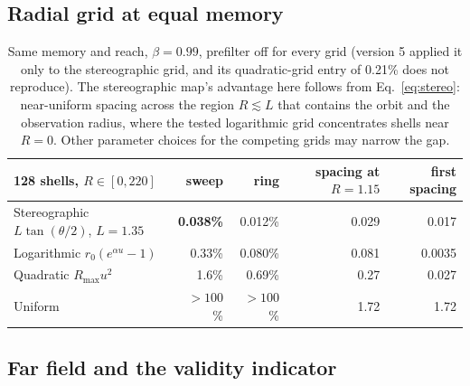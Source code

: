 \documentclass[11pt, a4paper]{article}
\begin{document}
\subsection{Radial grid at equal memory}
\begin{table}[htbp]
\centering
\begin{tabular}{@{}lrrrr@{}}
\toprule
128 shells, $R \in [0, 220]$ & sweep & ring & spacing at $R = 1.15$ & first spacing \\
\midrule
Stereographic $L\tan(\theta/2)$, $L = 1.35$ & \textbf{0.038\%} & 0.012\% & 0.029 & 0.017 \\
Logarithmic $r_0(e^{\alpha u} - 1)$         & 0.33\%  & 0.080\% & 0.081 & 0.0035 \\
Quadratic $R_{\max} u^2$                    & 1.6\%   & 0.69\%  & 0.27  & 0.027 \\
Uniform                                     & $>100$\% & $>100$\% & 1.72 & 1.72 \\
\bottomrule
\end{tabular}
\caption{Same memory and reach, $\beta = 0.99$, prefilter off for every grid (version 5 applied it only to the stereographic grid, and its quadratic-grid entry of 0.21\% does not reproduce). The stereographic map's advantage here follows from Eq.~\eqref{eq:stereo}: near-uniform spacing across the region $R \lesssim L$ that contains the orbit and the observation radius, where the tested logarithmic grid concentrates shells near $R = 0$. Other parameter choices for the competing grids may narrow the gap.}
\label{tab:grids}
\end{table}

\subsection{Far field and the validity indicator}\label{sec:far}
\begin{table}[htbp]
\centering
{}
\caption{Circular orbit, $\beta = 0.9$: relative $L_2$ error on rings of radius $R$ around the orbit centre, and in parentheses the number of the 64 observers marked by the validity indicator. The first column gives the outermost shell; the ring buffer holds 260 length units of history. Across all far-field cases run ($\beta = 0.5$ and $0.9$; $M_T = 128$, 512, 2048; taper on and off), the $L_2$ error over unmarked observers on a ring is at most 0.61\%, and the worst single unmarked observer is 1.6\% (at the edge of a marked region).}
\label{tab:far}
\end{table}
\end{document}
